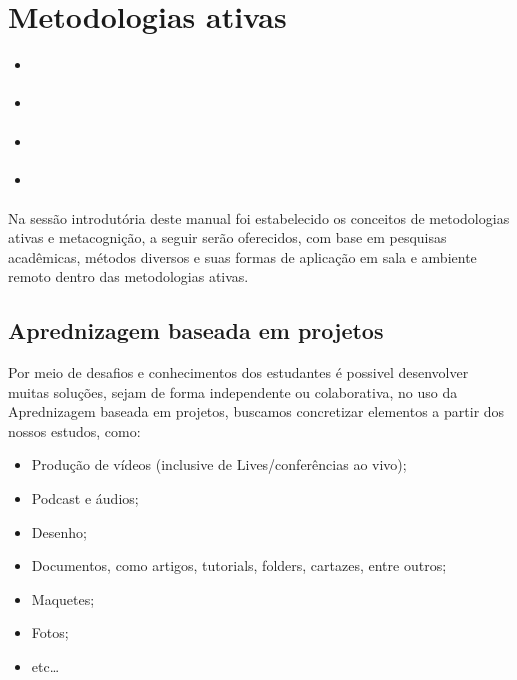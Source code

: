 \documentclass[letterpaper,10pt,brazil]{sphinxmanual}
\begin{document}
\chapter{Metodologias ativas}
\label{\detokenize{metodologias:metodologias-ativas}}\label{\detokenize{metodologias::doc}}
\begin{sphinxShadowBox}
\begin{itemize}
\item {} 
\label{\detokenize{metodologias:id1}}{\hyperref[\detokenize{metodologias:aprednizagem-baseada-em-projetos}]{}}

\item {} 
\label{\detokenize{metodologias:id2}}{\hyperref[\detokenize{metodologias:aprednizagem-baseada-em-problemas}]{}}

\item {} 
\label{\detokenize{metodologias:id3}}{\hyperref[\detokenize{metodologias:gamificacao}]{}}

\item {} 
\label{\detokenize{metodologias:id4}}{\hyperref[\detokenize{metodologias:sala-de-aula-invertida}]{}}

\end{itemize}
\end{sphinxShadowBox}

Na sessão introdutória deste manual foi estabelecido os conceitos de metodologias ativas e metacognição, a seguir serão oferecidos, com base em pesquisas acadêmicas, métodos diversos e suas formas de aplicação em sala e ambiente remoto dentro das metodologias ativas.


\section{Aprednizagem baseada em projetos}
\label{\detokenize{metodologias:aprednizagem-baseada-em-projetos}}
Por meio de desafios e conhecimentos dos estudantes é possivel desenvolver muitas soluções, sejam de forma independente ou colaborativa, no uso da Aprednizagem baseada em projetos, buscamos concretizar elementos a partir dos nossos estudos, como:
\begin{itemize}
\item {} 
Produção de vídeos (inclusive de Lives/conferências ao vivo);

\item {} 
Podcast e áudios;

\item {} 
Desenho;

\item {} 
Documentos, como artigos, tutorials, folders, cartazes, entre outros;

\item {} 
Maquetes;

\item {} 
Fotos;

\item {} 
etc…

\end{itemize}
\end{document}
